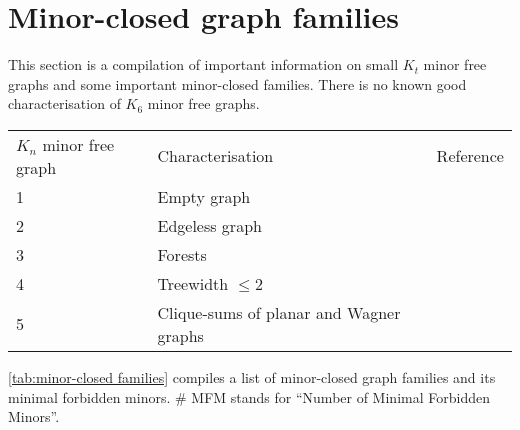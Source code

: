 \section{Minor-closed graph families}\label{sec:minor_closed_families}
This section is a compilation of important information on small $K_t$ minor free graphs and some important minor-closed families. There is no known good characterisation of $K_6$ minor free graphs. 

\begin{table}[h!]
    \centering
    \begin{tabular*}{\textwidth}{@{}lll@{}}
        \toprule
        $K_n$ minor free graph  & Characterisation  & Reference \\
        1                       & Empty graph       &           \\
        2                       & Edgeless graph    &           \\
        3                       & Forests           &           \\
        4                       & Treewidth $\leq 2$&  {\textcite{norinMath599GraphMinors2017}}         \\
        5                       & Clique-sums of planar and Wagner graphs & {\textcite{wagnerUeberEigenschaftEbenen1937}}
    \end{tabular*}
\end{table}


\cref{tab:minor-closed families} compiles a list of minor-closed graph families and its minimal forbidden minors. \# MFM stands for ``Number of Minimal Forbidden Minors''.

